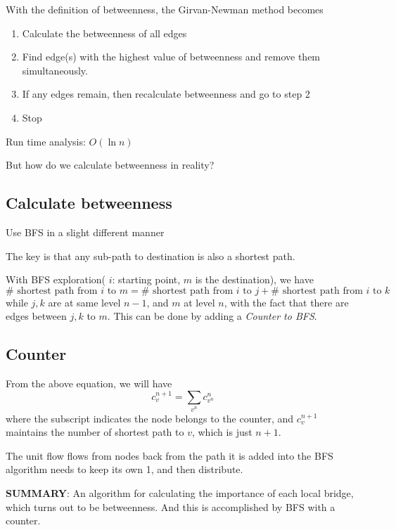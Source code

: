 With the definition of betweenness, the Girvan-Newman method becomes
\begin{enumerate}
	\item Calculate the betweenness of all edges
	\item Find edge(s) with the highest value of betweenness and remove them simultaneously.
	\item If any edges remain, then recalculate betweenness and go to step 2
	\item Stop
\end{enumerate}
Run time analysis: $O(\ln n)$

But how do we calculate betweenness in reality?
\subsection{Calculate betweenness}
\begin{intuition}
	Use BFS in a slight different manner
\end{intuition}
\begin{remark}
	The key is that any sub-path to destination is also a shortest path.
\end{remark}


With BFS exploration( $i$: starting point, $m$ is the destination), we have
\[
	\#\text{ shortest path from $i$ to $m$} =  \#\text{ shortest path from $i$ to $j$} +  \#\text{ shortest path from $i$ to $k$}
\]
while $j, k$ are at same level $n-1$, and $m$ at level $n$, with the fact that there are edges between $j, k$ to $m$. This can be done by adding a \emph{Counter to BFS}.

\subsection{Counter}

From the above equation, we will have
\[
	c_{v}^{n+1} = \sum_{v^n}c^n_{v^n}
\]
where the subscript indicates the node belongs to the counter, and $c_v^{n+1}$ maintains the number of shortest path to $v$, which is just $n+1$.

The unit flow flows from nodes back from the path it is added into the BFS algorithm needs to keep its own 1, and then distribute.

\textbf{SUMMARY}: An algorithm for calculating the importance of each local bridge, which turns out to be betweenness. And this is accomplished by BFS with a counter.
